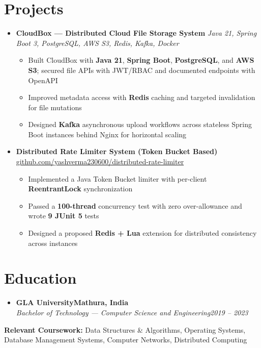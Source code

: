 \documentclass[letterpaper,11pt]{article}
\newcommand{\resumeItem}[1]{
  \item\small{{#1 \vspace{-2pt}}}
}
\newcommand{\resumeSubheading}[4]{
  \vspace{-2pt}\item
    \textbf{#1}\hfill \textbf{\small #2} \\
    \textit{\small #3}\hfill \textit{\small #4}\vspace{-7pt}
}
\newcommand{\resumeProjectHeading}[2]{
    \item
    \small #1\hfill \textbf{\small #2}\vspace{-7pt}
}
\newcommand{\resumeSubHeadingListStart}{\begin{itemize}[leftmargin=0.0in, label={}]}
\newcommand{\resumeSubHeadingListEnd}{\end{itemize}}
\newcommand{\resumeItemListStart}{\begin{itemize}}
\newcommand{\resumeItemListEnd}{\end{itemize}\vspace{-5pt}}
\begin{document}
\section{Projects}
  \resumeSubHeadingListStart
    \resumeProjectHeading
      {\textbf{CloudBox --- Distributed Cloud File Storage System} \textbar{} \textit{\small Java 21, Spring Boot 3, PostgreSQL, AWS S3, Redis, Kafka, Docker}}{}
      \resumeItemListStart
        \resumeItem{Built CloudBox with \textbf{Java 21}, \textbf{Spring Boot}, \textbf{PostgreSQL}, and \textbf{AWS S3}; secured file APIs with JWT/RBAC and documented endpoints with OpenAPI}
        \resumeItem{Improved metadata access with \textbf{Redis} caching and targeted invalidation for file mutations}
        \resumeItem{Designed \textbf{Kafka} asynchronous upload workflows across stateless Spring Boot instances behind Nginx for horizontal scaling}
      \resumeItemListEnd
    \resumeProjectHeading
      {\textbf{Distributed Rate Limiter System (Token Bucket Based)} \textbar{} \href{https://github.com/yashverma230600/distributed-rate-limiter}{github.com/yashverma230600/distributed-rate-limiter}}{}
      \resumeItemListStart
        \resumeItem{Implemented a Java Token Bucket limiter with per-client \textbf{ReentrantLock} synchronization}
        \resumeItem{Passed a \textbf{100-thread} concurrency test with zero over-allowance and wrote \textbf{9 JUnit 5} tests}
        \resumeItem{Designed a proposed \textbf{Redis + Lua} extension for distributed consistency across instances}
      \resumeItemListEnd
  \resumeSubHeadingListEnd
\vspace{-8pt}

\section{Education}
  \resumeSubHeadingListStart
    \resumeSubheading
      {GLA University}{Mathura, India}
      {Bachelor of Technology --- Computer Science and Engineering}{2019 -- 2023}
  \resumeSubHeadingListEnd
  \vspace{-2pt}
  \begin{itemize}[leftmargin=0.15in, label={}]
    \small{\item{
      \textbf{Relevant Coursework:} Data Structures \& Algorithms, Operating Systems, Database Management Systems, Computer Networks, Distributed Computing
    }}
  \end{itemize}
\vspace{-4pt}
\end{document}
